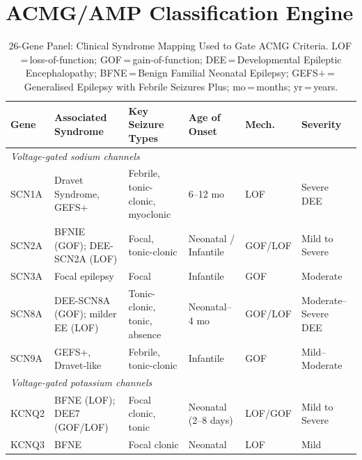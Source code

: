 \documentclass[conference]{IEEEtran}
\begin{document}
\section{ACMG/AMP Classification Engine}
\label{sec:acmg}

\begin{table}[!t]
\caption{26-Gene Panel: Clinical Syndrome Mapping Used to Gate ACMG Criteria.
  LOF\,=\,loss-of-function; GOF\,=\,gain-of-function;
  DEE\,=\,Developmental Epileptic Encephalopathy;
  BFNE\,=\,Benign Familial Neonatal Epilepsy;
  GEFS$+$\,=\,Generalised Epilepsy with Febrile Seizures Plus;
  mo\,=\,months; yr\,=\,years.}
\label{tab:genepanel}
\begin{center}
\scriptsize
\setlength{\tabcolsep}{3.5pt}
\begin{tabular}{p{1.1cm}p{3.8cm}p{3.8cm}p{2.2cm}p{0.8cm}p{2.2cm}}
\toprule
\textbf{Gene} & \textbf{Associated Syndrome} & \textbf{Key Seizure Types} & \textbf{Age of Onset} & \textbf{Mech.} & \textbf{Severity} \\
\midrule
\multicolumn{6}{l}{\textit{Voltage-gated sodium channels}} \\
SCN1A   & Dravet Syndrome, GEFS$+$                    & Febrile, tonic-clonic, myoclonic        & 6--12 mo              & LOF     & Severe DEE \\
SCN2A   & BFNIE (GOF); DEE-SCN2A (LOF)                & Focal, tonic-clonic                     & Neonatal / Infantile  & GOF/LOF & Mild to Severe \\
SCN3A   & Focal epilepsy                              & Focal                                   & Infantile             & GOF     & Moderate \\
SCN8A   & DEE-SCN8A (GOF); milder EE (LOF)            & Tonic-clonic, tonic, absence            & Neonatal--4 mo        & GOF/LOF & Moderate--Severe DEE \\
SCN9A   & GEFS$+$, Dravet-like                        & Febrile, tonic-clonic                   & Infantile             & GOF     & Mild--Moderate \\
\midrule
\multicolumn{6}{l}{\textit{Voltage-gated potassium channels}} \\
KCNQ2   & BFNE (LOF); DEE7 (GOF/LOF)                 & Focal clonic, tonic                     & Neonatal (2--8 days)  & LOF/GOF & Mild to Severe \\
KCNQ3   & BFNE                                        & Focal clonic                            & Neonatal              & LOF     & Mild \\
\midrule

\end{tabular}
\end{center}
\end{table}
\end{document}
